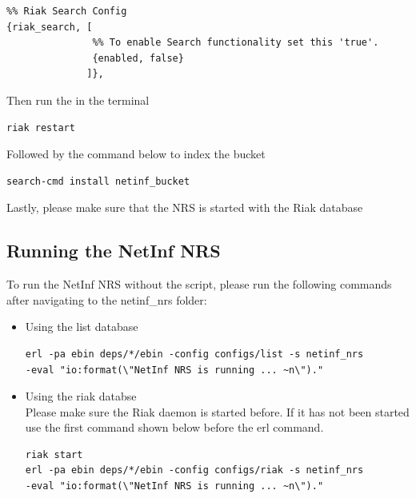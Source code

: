 \begin{verbatim}
%% Riak Search Config
{riak_search, [
               %% To enable Search functionality set this 'true'.
               {enabled, false}
              ]},
\end{verbatim}

Then run the in the terminal

\begin{verbatim}
riak restart
\end{verbatim}

Followed by the command below to index the bucket

\begin{verbatim}
search-cmd install netinf_bucket
\end{verbatim}

Lastly, please make sure that the NRS is started with the Riak database

\subsection{Running the NetInf NRS}

To run the NetInf NRS without the script, please run the following commands after navigating to the netinf\_nrs folder:

\begin{itemize}
\item Using the list database \\
\begin{verbatim}
erl -pa ebin deps/*/ebin -config configs/list -s netinf_nrs 
-eval "io:format(\"NetInf NRS is running ... ~n\")." 
\end{verbatim}

\item Using the riak databse \\
Please make sure the Riak daemon is started before. If it has not been started use the first command shown below before the erl command.
\begin{verbatim}
riak start
erl -pa ebin deps/*/ebin -config configs/riak -s netinf_nrs 
-eval "io:format(\"NetInf NRS is running ... ~n\")." 
\end{verbatim}
\end{itemize}
